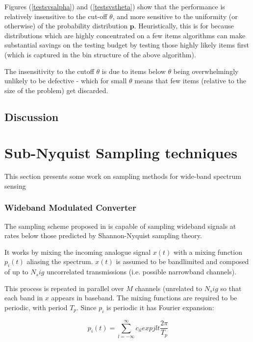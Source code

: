 \documentclass[conference]{IEEEtran}
\newcommand{\vc}[1]{{\mathbf{ #1}}}
\begin{document}
Figures (\ref{testsvsalpha}) and (\ref{testsvstheta}) show that the performance is relatively insensitive to the cut-off \(\theta\), and more sensitive to the uniformity (or otherwise) of the probability distribution \(\vc{p}\). Heuristically, this is for because distributions which are highly concentrated on a few items algorithms can make substantial savings on the testing budget by testing those highly likely items first (which is captured in the bin structure of the above algorithm). 

The insensitivity to the cutoff \(\theta\) is due to items below \(\theta\) being overwhelmingly unlikely to be defective - which for small \(\theta\) means that few items (relative to the size of the problem) get discarded.

\subsection{Discussion}
%

\section{Sub-Nyquist Sampling techniques}
This section presents some work on sampling methods for wide-band spectrum sensing

\subsubsection{Wideband Modulated Converter} 
The sampling scheme proposed in \cite{Mishali2010} is capable of sampling wideband signals at rates below those predicted by Shannon-Nyquist sampling theory. 

It works by mixing the incoming analogue signal \(x\left(t\right)\) with a mixing function \(p_i\left(t\right)\) aliasing the spectrum. \(x\left(t\right)\) is assumed to be bandlimited and composed of up to \(N_sig\) uncorrelated transmissions (i.e. possible narrowband channels). 

This process is repeated in parallel over \(M\) channels (unrelated to \(N_sig\) so that each band in \(x\) appears in baseband. The mixing functions are required to be periodic, with period \(T_p\). Since \(p_i\) is periodic it has Fourier expansion:

\begin{equation}
p_i\left(t\right) = \sum_{l=-\infty}^{\infty} c_{il} exp{jlt\frac{2\pi}{T_p}}
\end{equation}
\end{document}
